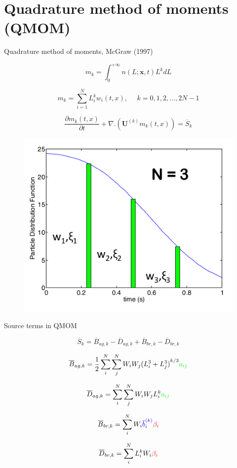\documentclass{beamer}
\begin{document}
\section{Quadrature method of moments (QMOM)}


\begin{frame}{Quadrature method of moments, McGraw (1997)}

\begin{equation*}
m_k=\int_{0}^{+\infty}n(L;\textbf{x},t)L^kdL
\end{equation*}

\begin{equation*}
m_k =\sum_{i=1}^{N}L_i^k w_i(t,x), \ \ \ \ \ \ k=0, 1, 2, ..., 2N-1
\end{equation*}

\begin{equation*}
\frac{\partial m_k (t,x)}{\partial t}+\nabla .(\textbf{U}^{(k)}m_k(t,x)) = \overline{S}_k 
\end{equation*}


\begin{figure}
\includegraphics[width=0.3\linewidth]{nodes.png}
\end{figure}
  
\end{frame}

\begin{frame}{Source terms in QMOM}

\begin{equation*}
\overline{S}_k =\overline{B}_{ag,k}-\overline{D}_{ag,k} +\overline{B}_{br,k}-\overline{D}_{br,k} 
\end{equation*}

\begin{equation*}
\overline{B}_{ag,k} =\frac{1}{2}\sum_{i}^{N}\sum_{j}^{N} W_i W_j {(L_i^3+L_j^3)}^{k/3} \textcolor{green}{a_{ij}}
\end{equation*}

\begin{equation*}
\overline{D}_{ag,k} =\sum_{i}^{N}\sum_{j}^{N} W_i W_j L_i^k \textcolor{green}{a_{ij}}
\end{equation*}

\begin{equation*}
\overline{B}_{br,k} =\sum_{i}^{N} W_i \textcolor{blue}{\overline{b}^{(k)}_i} \textcolor{red}{\beta_i}
\end{equation*}

\begin{equation*}
\overline{D}_{br,k} =\sum_{i}^{N} L_i^k  W_i \textcolor{red}{\beta_i} 
\end{equation*}

\end{frame}
\end{document}
